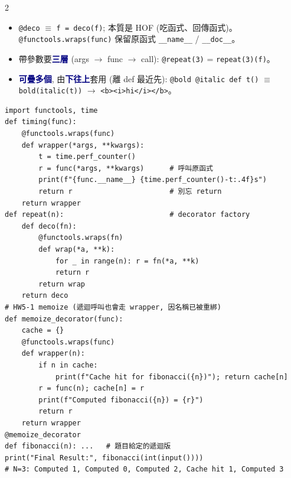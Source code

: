 \documentclass[12pt]{extarticle}
\newcommand{\py}{\lstinline[language={},basicstyle=\ttfamily\fontsize{10.5}{13}\selectfont\bfseries,backgroundcolor=\color{white}]}
\renewcommand{\sec}[1]{\par\vspace{3pt}\noindent{\setlength{\fboxsep}{2pt}\colorbox{navy}{\parbox{\dimexpr\linewidth-4pt}{\color{white}\bfseries\fontsize{13}{16}\selectfont #1}}}\par\vspace{2pt}}
\newcommand{\sub}[1]{\textcolor{navy}{\textbf{#1}}}
\newcommand{\ra}{$\rightarrow$}
\newenvironment{bl}{\begin{itemize}[leftmargin=10pt,itemsep=1pt,parsep=0pt,topsep=1pt,partopsep=0pt,labelsep=3pt,label={\textbullet}]}{\end{itemize}}
\begin{document}
\begin{multicols*}{2}
\sec{17. Decorator}
\begin{bl}
\item \py|@deco| $\equiv$ \py|f = deco(f)|; 本質是 HOF (吃函式、回傳函式)。\py|@functools.wraps(func)| 保留原函式 \py|__name__| / \py|__doc__|。
\item 帶參數要\sub{三層} (args $\to$ func $\to$ call): \py|@repeat(3)| = \py|repeat(3)(f)|。
\item \sub{可疊多個}, 由\sub{下往上}套用 (離 def 最近先): \py|@bold @italic def t()| $\equiv$ \py|bold(italic(t))| \ra{} \py|<b><i>hi</i></b>|。
\end{bl}
\begin{lstlisting}
import functools, time
def timing(func):
    @functools.wraps(func)
    def wrapper(*args, **kwargs):
        t = time.perf_counter()
        r = func(*args, **kwargs)      # 呼叫原函式
        print(f"{func.__name__} {time.perf_counter()-t:.4f}s")
        return r                       # 別忘 return
    return wrapper
def repeat(n):                         # decorator factory
    def deco(fn):
        @functools.wraps(fn)
        def wrap(*a, **k):
            for _ in range(n): r = fn(*a, **k)
            return r
        return wrap
    return deco
# HW5-1 memoize (遞迴呼叫也會走 wrapper, 因名稱已被重綁)
def memoize_decorator(func):
    cache = {}
    @functools.wraps(func)
    def wrapper(n):
        if n in cache:
            print(f"Cache hit for fibonacci({n})"); return cache[n]
        r = func(n); cache[n] = r
        print(f"Computed fibonacci({n}) = {r}")
        return r
    return wrapper
@memoize_decorator
def fibonacci(n): ...   # 題目給定的遞迴版
print("Final Result:", fibonacci(int(input())))
# N=3: Computed 1, Computed 0, Computed 2, Cache hit 1, Computed 3
\end{lstlisting}


\end{multicols*}
\end{document}
